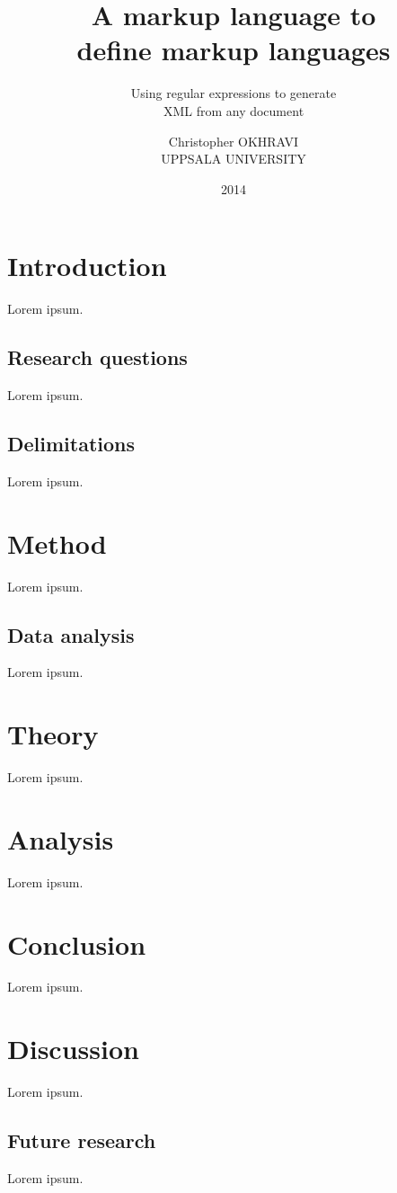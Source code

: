 \documentclass{scrreprt}
\date{2014}
\title{ A markup language to \\define markup languages }
\subtitle{ Using regular expressions to generate \\XML from any document  }
\author{ Christopher OKHRAVI \\ UPPSALA UNIVERSITY }
\begin{document}
\maketitle
\tableofcontents
\pagebreak



\chapter{Introduction}
Lorem ipsum.

\section{Research questions}
Lorem ipsum.

\section{Delimitations}
Lorem ipsum.




\chapter{Method}
Lorem ipsum.

\section{Data analysis}
Lorem ipsum.





\chapter{Theory}
Lorem ipsum.





\chapter{Analysis}
Lorem ipsum.





\chapter{Conclusion}
Lorem ipsum.





\chapter{Discussion}
Lorem ipsum.

\section{Future research}
Lorem ipsum.
\end{document}
